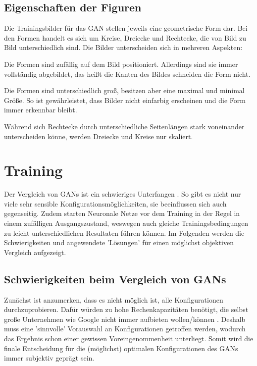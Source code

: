 \subsection{Eigenschaften der Figuren}
Die Trainingsbilder für das GAN stellen jeweils eine geometrische Form dar.
Bei den Formen handelt es sich um Kreise, Dreiecke und Rechtecke, die von Bild zu Bild unterschiedlich sind.
Die Bilder unterscheiden sich in mehreren Aspekten:
\begin{description}[style=nextline]
	\item[Position]
	Die Formen sind zufällig auf dem Bild positioniert.
	Allerdings sind sie immer vollständig abgebildet, das heißt die Kanten des Bildes schneiden die Form nicht.
	
	\item[Größe und Form]
	Die Formen sind unterschiedlich groß, besitzen aber eine maximal und minimal Größe.
	So ist gewährleistet, dass Bilder nicht einfarbig erscheinen und die Form immer erkennbar bleibt.
	
	Während sich Rechtecke durch unterschiedliche Seitenlängen stark voneinander unterscheiden könne, werden Dreiecke und Kreise nur skaliert.
\end{description}

\section{Training}
Der Vergleich von GANs ist ein schwieriges Unterfangen \cite{are-gans-created-equally}.
So gibt es nicht nur viele sehr sensible Konfigurationsmöglichkeiten, sie beeinflussen sich auch gegenseitig.
Zudem starten Neuronale Netze vor dem Training in der Regel in einem zufälligen Ausgangszustand, weswegen auch gleiche Trainingsbedingungen zu leicht unterschiedlichen Resultaten führen können.
Im Folgenden werden die Schwierigkeiten und angewendete 'Lösungen' für einen möglichst objektiven Vergleich aufgezeigt.

\subsection{Schwierigkeiten beim Vergleich von GANs}
Zunächst ist anzumerken, dass es nicht möglich ist, alle Konfigurationen durchzuprobieren.
Dafür würden zu hohe Rechenkapazitäten benötigt, die selbst große Unternehmen wie Google nicht immer aufbieten wollen/können \cite{are-gans-created-equally}.
Deshalb muss eine 'sinnvolle' Vorauswahl an Konfigurationen getroffen werden, wodurch das Ergebnis schon einer gewissen Voreingenommenheit unterliegt.
Somit wird die finale Entscheidung für die (möglichst) optimalen Konfigurationen des GANs immer subjektiv geprägt sein.

